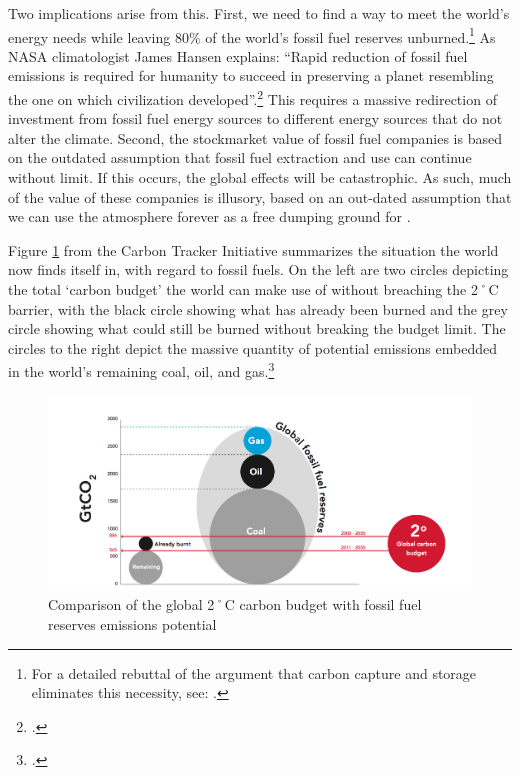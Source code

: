 Two implications arise from this. 
First, we need to find a way to meet the world's energy needs while leaving 80\% of the world's fossil fuel reserves unburned.\footnote{For a detailed rebuttal of the argument that carbon capture and storage eliminates this necessity, see: .} 
As NASA climatologist James Hansen explains: ``Rapid reduction of fossil fuel emissions is required for humanity to
succeed in preserving a planet resembling the one on which civilization developed''.\footcite[][]{HansenPaleo}
This requires a massive redirection of investment from fossil fuel energy sources to different energy sources that do not alter the climate.
Second, the stockmarket value of fossil fuel companies is based on the outdated assumption that fossil fuel extraction and use can continue without limit.
If this occurs, the global effects will be catastrophic.
As such, much of the value of these companies is illusory, based on an out-dated assumption that we can use the atmosphere forever as a free dumping ground for .


Figure \ref{fig:TwoDegreeBudget} from the Carbon Tracker Initiative summarizes the situation the world now finds itself in, with regard to fossil fuels.
On the left are two circles depicting the total `carbon budget' the world can make use of without breaching the 2˚C barrier, with the black circle showing what has already been burned and the grey circle showing what could still be burned without breaking the budget limit.
The circles to the right depict the massive quantity of potential  emissions embedded in the world's remaining coal, oil, and gas.\footcite[][p. 6]{CTI2012}



\begin{figure}
\includegraphics[width=\textwidth]{s1-carbon-budget.png}
\centering
\caption{Comparison of the global 2˚C carbon budget with fossil fuel reserves  emissions potential}
\label{fig:TwoDegreeBudget}
\end{figure}




